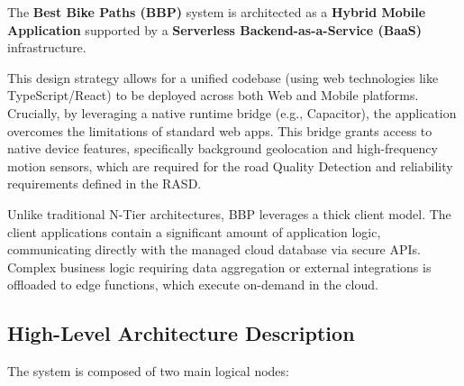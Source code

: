 The \textbf{Best Bike Paths (BBP)} system is architected as a \textbf{Hybrid Mobile Application} supported by a \textbf{Serverless Backend-as-a-Service (BaaS)} infrastructure.

This design strategy allows for a unified codebase (using web technologies like TypeScript/React) to be deployed across both Web and Mobile platforms. Crucially, by leveraging a native runtime bridge (e.g., Capacitor), the application overcomes the limitations of standard web apps. This bridge grants access to native device features, specifically background geolocation and high-frequency motion sensors, which are required for the road Quality Detection and reliability requirements defined in the RASD.

Unlike traditional N-Tier architectures, BBP leverages a thick client model. The client applications contain a significant amount of application logic, communicating directly with the managed cloud database via secure APIs. Complex business logic requiring data aggregation or external integrations is offloaded to edge functions, which execute on-demand in the cloud.

\subsection{High-Level Architecture Description}
The system is composed of two main logical nodes:

